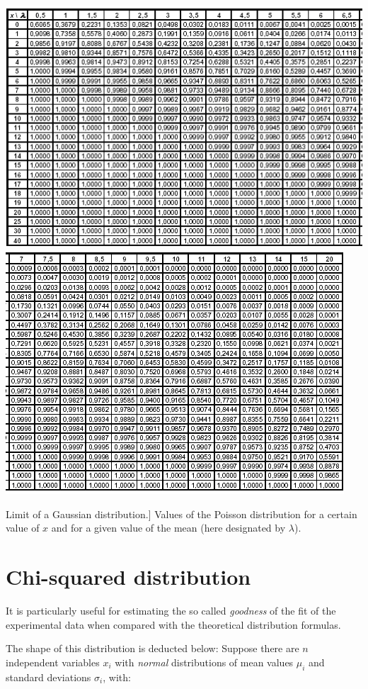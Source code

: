 	\bfi[H]
		\bc
			\includegraphics[width=.9\textwidth]{img/app43.png}\\[12pt]
			\includegraphics[width=.9\textwidth]{img/app44.png}\\
			\caption
				[Limit of a Gaussian distribution.]
				{Values ​​of the Poisson distribution for a certain value of $x$ and for a given value of the mean (here designated by $\lambda$).}\label{tab:tables}
		\ec
	\efi

\section{Chi-squared distribution}\label{sec:chi2}

It is particularly useful for estimating the so called \textit{goodness} of the fit of the experimental data when compared with the theoretical distribution formulas.

The shape of this distribution is deducted below: Suppose there are $n$ independent variables $x_i$ with \textit{normal} distributions of mean values $\mu_i$ and ​​standard deviations $\sigma_i$,  with:

